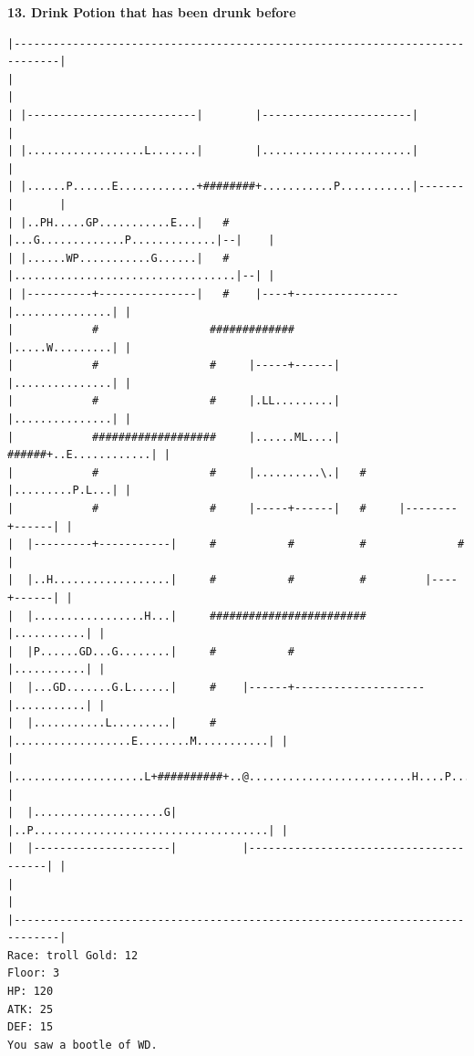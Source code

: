 \documentclass[11pt]{article}
\theoremstyle{plain}
\begin{document}
\newpage
\textbf{13. Drink Potion that has been drunk before}
\begin{Verbatim}[fontsize=\scriptsize]
|-----------------------------------------------------------------------------|
|                                                                             |
| |--------------------------|        |-----------------------|               |
| |..................L.......|        |.......................|               |
| |......P......E............+########+...........P...........|-------|       |
| |..PH.....GP...........E...|   #    |...G.............P.............|--|    |
| |......WP...........G......|   #    |..................................|--| |
| |----------+---------------|   #    |----+----------------|...............| |
|            #                 #############                |.....W.........| |
|            #                 #     |-----+------|         |...............| |
|            #                 #     |.LL.........|         |...............| |
|            ###################     |......ML....|   ######+..E............| |
|            #                 #     |..........\.|   #     |.........P.L...| |
|            #                 #     |-----+------|   #     |--------+------| |
|  |---------+-----------|     #           #          #              #        |
|  |..H..................|     #           #          #         |----+------| |
|  |.................H...|     ########################         |...........| |
|  |P......GD...G........|     #           #                    |...........| |
|  |...GD.......G.L......|     #    |------+--------------------|...........| |
|  |...........L.........|     #    |..................E........M...........| |
|  |....................L+##########+..@.........................H....P.....| |
|  |....................G|          |..P....................................| |
|  |---------------------|          |---------------------------------------| |
|                                                                             |
|-----------------------------------------------------------------------------|
Race: troll Gold: 12                                                   Floor: 3
HP: 120
ATK: 25
DEF: 15
You saw a bootle of WD. 


\end{Verbatim}
\end{document}
